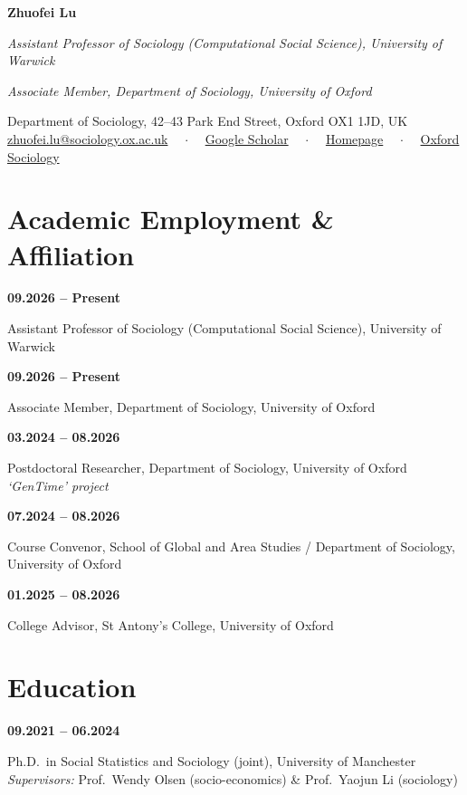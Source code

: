 \documentclass[11pt,a4paper]{article}
\newcommand{\cventry}[2]{%
  \noindent
  \begin{minipage}[t]{0.22\textwidth}\raggedright\textbf{#1}\end{minipage}%
  \hspace{0.015\textwidth}%
  \begin{minipage}[t]{0.755\textwidth}#2\end{minipage}%
  \par\vspace{4pt}%
}
\begin{document}
\pagestyle{empty}

\begin{center}
  {\LARGE\bfseries Zhuofei Lu}\par
  \vspace{4pt}
  \textit{Assistant Professor of Sociology (Computational Social Science), University of Warwick}\par
  \vspace{2pt}
  \textit{Associate Member, Department of Sociology, University of Oxford}\par
  \vspace{6pt}
  \small
  Department of Sociology, 42--43 Park End Street, Oxford OX1 1JD, UK\\[2pt]
  \href{mailto:zhuofei.lu@sociology.ox.ac.uk}{zhuofei.lu@sociology.ox.ac.uk}
  ~~$\cdot$~~
  \href{https://scholar.google.com/citations?user=IEITTwcAAAAJ}{Google Scholar}
  ~~$\cdot$~~
  \href{https://zhuofei-code.github.io/website/}{Homepage}
  ~~$\cdot$~~
  \href{https://www.sociology.ox.ac.uk/people/zhuofei-lu}{Oxford Sociology}
\end{center}

\section*{Academic Employment \& Affiliation}
\cventry{09.2026 -- Present}{Assistant Professor of Sociology (Computational Social Science), University of Warwick}

\cventry{09.2026 -- Present}{Associate Member, Department of Sociology, University of Oxford}

\cventry{03.2024 -- 08.2026}{Postdoctoral Researcher, Department of Sociology, University of Oxford\\
  \textit{`GenTime' project}}

\cventry{07.2024 -- 08.2026}{Course Convenor, School of Global and Area Studies / Department of Sociology, University of Oxford}

\cventry{01.2025 -- 08.2026}{College Advisor, St Antony's College, University of Oxford}

\section*{Education}
\cventry{09.2021 -- 06.2024}{Ph.D.\ in Social Statistics and Sociology (joint), University of Manchester\\
  \textit{Supervisors:} Prof.\ Wendy Olsen (socio-economics) \& Prof.\ Yaojun Li (sociology)}
\end{document}
